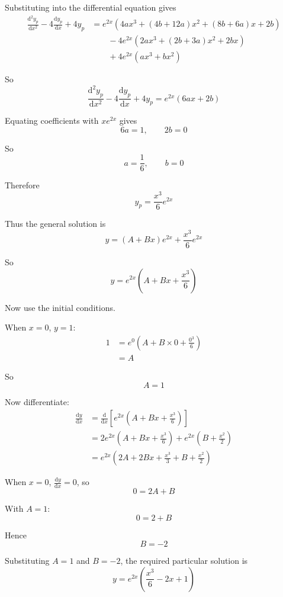 \documentclass[leqno]{article}
\begin{document}
\begin{enumerate}[
  label=\textbf{\arabic*.},
  leftmargin=*,
  topsep=0pt,
  partopsep=0pt,
  parsep=0pt
]
\begin{djsSolution}
Substituting into the differential equation gives
\begin{align*}
\frac{\mathrm{d}^2y_p}{\mathrm{d}x^2}-4\frac{\mathrm{d}y_p}{\mathrm{d}x}+4y_p
&= e^{2x}\left(4ax^3+(4b+12a)x^2+(8b+6a)x+2b\right) \\
&\qquad -4e^{2x}\left(2ax^3+(2b+3a)x^2+2bx\right) \\
&\qquad +4e^{2x}(ax^3+bx^2)
\end{align*}

So
\[
\frac{\mathrm{d}^2y_p}{\mathrm{d}x^2}-4\frac{\mathrm{d}y_p}{\mathrm{d}x}+4y_p
=e^{2x}(6ax+2b)
\]

Equating coefficients with $xe^{2x}$ gives
\[
6a=1, \qquad 2b=0
\]

So
\[
a=\frac{1}{6}, \qquad b=0
\]

Therefore
\[
y_p=\frac{x^3}{6}e^{2x}
\]

Thus the general solution is
\[
y=(A+Bx)e^{2x}+\frac{x^3}{6}e^{2x}
\]

So
\[
y=e^{2x}\left(A+Bx+\frac{x^3}{6}\right)
\]

Now use the initial conditions.

When $x=0$, $y=1$:
\begin{align*}
1
&= e^{0}\left(A+B\times 0+\frac{0^3}{6}\right) \\
&= A
\end{align*}

So
\[
A=1
\]

Now differentiate:
\begin{align*}
\frac{\mathrm{d}y}{\mathrm{d}x}
&= \frac{\mathrm{d}}{\mathrm{d}x}\left[e^{2x}\left(A+Bx+\frac{x^3}{6}\right)\right] \\
&= 2e^{2x}\left(A+Bx+\frac{x^3}{6}\right)+e^{2x}\left(B+\frac{x^2}{2}\right) \\
&= e^{2x}\left(2A+2Bx+\frac{x^3}{3}+B+\frac{x^2}{2}\right)
\end{align*}

When $x=0$, $\frac{\mathrm{d}y}{\mathrm{d}x}=0$, so
\[
0=2A+B
\]

With $A=1$:
\[
0=2+B
\]

Hence
\[
B=-2
\]

Substituting $A=1$ and $B=-2$, the required particular solution is
\[
y=e^{2x}\left(\frac{x^3}{6}-2x+1\right)
\]
\end{djsSolution}
\end{enumerate}
\end{document}

